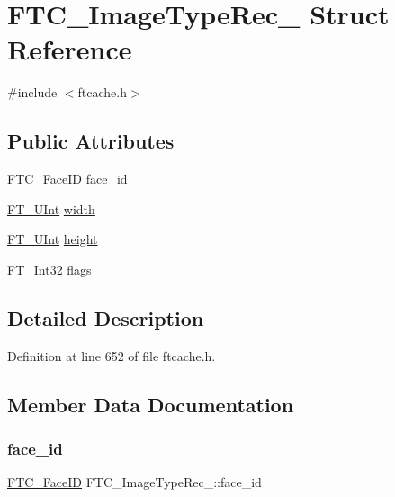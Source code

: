 \hypertarget{struct_f_t_c___image_type_rec__}{}\section{F\+T\+C\+\_\+\+Image\+Type\+Rec\+\_\+ Struct Reference}
\label{struct_f_t_c___image_type_rec__}


{\ttfamily \#include $<$ftcache.\+h$>$}

\subsection*{Public Attributes}
\begin{DoxyCompactItemize}
\item 
\mbox{\hyperlink{ftcache_8h_a5da66c12c497bf5888638100876c7197}{F\+T\+C\+\_\+\+Face\+ID}} \mbox{\hyperlink{struct_f_t_c___image_type_rec___a9851b8d4a06baacd18d5b9856fd85abd}{face\+\_\+id}}
\item 
\mbox{\hyperlink{fttypes_8h_abcb8db4dbf35d2b55a9e8c7b0926dc52}{F\+T\+\_\+\+U\+Int}} \mbox{\hyperlink{struct_f_t_c___image_type_rec___abd2bc251e7dbded1932e25841a41ab71}{width}}
\item 
\mbox{\hyperlink{fttypes_8h_abcb8db4dbf35d2b55a9e8c7b0926dc52}{F\+T\+\_\+\+U\+Int}} \mbox{\hyperlink{struct_f_t_c___image_type_rec___a29ac83aa58a7d9d669d27ddcbb970f95}{height}}
\item 
F\+T\+\_\+\+Int32 \mbox{\hyperlink{struct_f_t_c___image_type_rec___a391782ed8c67de86591c71f276ea6454}{flags}}
\end{DoxyCompactItemize}


\subsection{Detailed Description}


Definition at line 652 of file ftcache.\+h.



\subsection{Member Data Documentation}
\mbox{\label{struct_f_t_c___image_type_rec___a9851b8d4a06baacd18d5b9856fd85abd}} 
\subsubsection{\texorpdfstring{face\_id}{face\_id}}
{\footnotesize\ttfamily \mbox{\hyperlink{ftcache_8h_a5da66c12c497bf5888638100876c7197}{F\+T\+C\+\_\+\+Face\+ID}} F\+T\+C\+\_\+\+Image\+Type\+Rec\+\_\+\+::face\+\_\+id}



